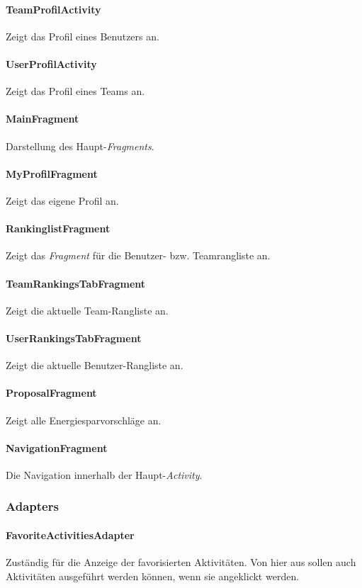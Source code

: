 \paragraph{TeamProfilActivity} Zeigt das Profil eines Benutzers an.
\paragraph{UserProfilActivity} Zeigt das Profil eines Teams an.
\paragraph{MainFragment} Darstellung des Haupt-\emph{Fragments}.
\paragraph{MyProfilFragment} Zeigt das eigene Profil an.
\paragraph{RankinglistFragment} Zeigt das \emph{Fragment} für die Benutzer- bzw. Teamrangliste an.
\paragraph{TeamRankingsTabFragment} Zeigt die aktuelle Team-Rangliste an.
\paragraph{UserRankingsTabFragment} Zeigt die aktuelle Benutzer-Rangliste an.
\paragraph{ProposalFragment} Zeigt alle Energiesparvorschläge an.
\paragraph{NavigationFragment} Die Navigation innerhalb der Haupt-\emph{Activity}.

\subsubsection{Adapters}
\paragraph{FavoriteActivitiesAdapter} Zuständig für die Anzeige der favorisierten Aktivitäten. Von hier aus sollen auch Aktivitäten ausgeführt werden können, wenn sie angeklickt werden.

